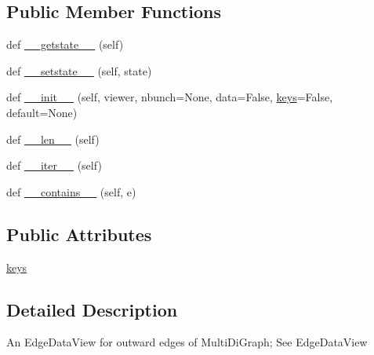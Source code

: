 \subsection*{Public Member Functions}
\begin{DoxyCompactItemize}
\item 
def \hyperlink{classnetworkx_1_1classes_1_1reportviews_1_1OutMultiEdgeDataView_a0eb6366759eb1151e4f1de781d7c9165}{\+\_\+\+\_\+getstate\+\_\+\+\_\+} (self)
\item 
def \hyperlink{classnetworkx_1_1classes_1_1reportviews_1_1OutMultiEdgeDataView_a4cbf88dd17b8b37df27e24523688f65e}{\+\_\+\+\_\+setstate\+\_\+\+\_\+} (self, state)
\item 
def \hyperlink{classnetworkx_1_1classes_1_1reportviews_1_1OutMultiEdgeDataView_ae7bca80a92e085401dd79b167a934627}{\+\_\+\+\_\+init\+\_\+\+\_\+} (self, viewer, nbunch=None, data=False, \hyperlink{classnetworkx_1_1classes_1_1reportviews_1_1OutMultiEdgeDataView_abe8c5e0ffa439de6eae2dac5c8aab750}{keys}=False, default=None)
\item 
def \hyperlink{classnetworkx_1_1classes_1_1reportviews_1_1OutMultiEdgeDataView_a2141a305f183ebdcd9e48dd16db368a0}{\+\_\+\+\_\+len\+\_\+\+\_\+} (self)
\item 
def \hyperlink{classnetworkx_1_1classes_1_1reportviews_1_1OutMultiEdgeDataView_a63a1708dd55c373e1660f486ee3142de}{\+\_\+\+\_\+iter\+\_\+\+\_\+} (self)
\item 
def \hyperlink{classnetworkx_1_1classes_1_1reportviews_1_1OutMultiEdgeDataView_abec11588d24a5a032b9ce599cf36ed3b}{\+\_\+\+\_\+contains\+\_\+\+\_\+} (self, e)
\end{DoxyCompactItemize}
\subsection*{Public Attributes}
\begin{DoxyCompactItemize}
\item 
\hyperlink{classnetworkx_1_1classes_1_1reportviews_1_1OutMultiEdgeDataView_abe8c5e0ffa439de6eae2dac5c8aab750}{keys}
\end{DoxyCompactItemize}


\subsection{Detailed Description}
\begin{DoxyVerb}An EdgeDataView for outward edges of MultiDiGraph; See EdgeDataView\end{DoxyVerb}
 

